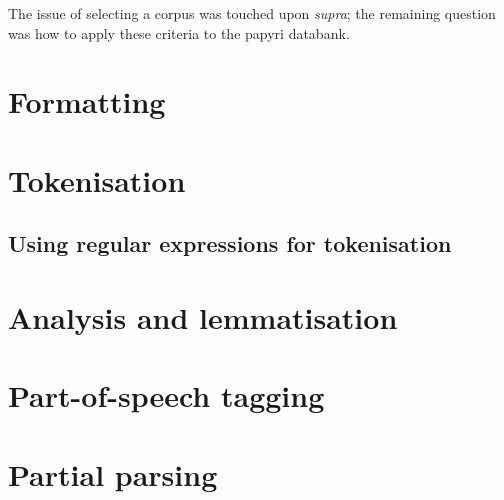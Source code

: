 The issue of selecting a corpus was touched upon \emph{supra}; the remaining
question was how to apply these criteria to the papyri databank.

\section{Formatting}

\section{Tokenisation}

\subsection{Using regular expressions for tokenisation}

\section{Analysis and lemmatisation}

\section{Part-of-speech tagging}

\section{Partial parsing}
